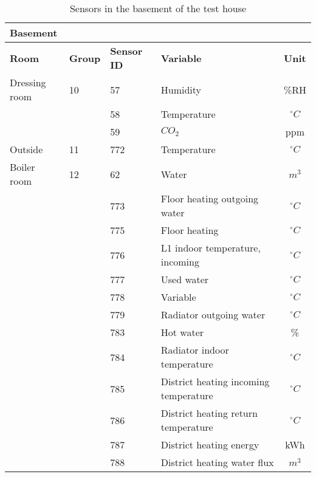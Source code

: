 \begin{table}
  \caption{Sensors in the basement of the test house} 
  \begin{tabular}{l | l | l | l | c}
    \multicolumn{4}{l}{\textbf{Basement}} \\
    \hline
   	\textbf{Room} & \textbf{Group} & \textbf{Sensor ID} & \textbf{Variable} & \textbf{Unit} \\
    \hline
    Dressing room & 10 & 57 & Humidity & \%RH \\
     & & 58 & Temperature & $^\circ C$ \\
     & & 59 & $CO_2$ & ppm \\
    \hline
    Outside & 11 & 772 & Temperature & $^\circ C$ \\
    \hline
    Boiler room & 12 & 62 & Water & $m^3$ \\
    & & 773 & Floor heating outgoing water & $^\circ C$ \\
    & & 775 & Floor heating & $^\circ C$ \\
    & & 776 & L1 indoor temperature, incoming & $^\circ C$ \\
    & & 777 & Used water & $^\circ C$ \\
    & & 778 & Variable & $^\circ C$ \\
    & & 779 & Radiator outgoing water & $^\circ C$ \\
    & & 783 & Hot water & \% \\
    & & 784 & Radiator indoor temperature & $^\circ C$ \\
    & & 785 & District heating incoming temperature & $^\circ C$ \\
    & & 786 & District heating return temperature & $^\circ C$ \\
    & & 787 & District heating energy & kWh \\
    & & 788 & District heating water flux & $m^3$ \\
  \end{tabular}
  \label{table:basement}
\end{table}